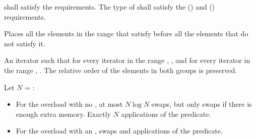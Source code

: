 \begin{itemdescr}
\pnum
\requires
{} shall satisfy the
 requirements. The type
of  shall satisfy the
 () and
 () requirements.

\pnum
\effects
Places all the elements in the range
that satisfy  before all the
elements that do not satisfy it.

\pnum
\returns
An iterator
such that for every iterator
in the range
,
,
and for every iterator
in the range
,
.
The relative order of the elements in both groups is preserved.

\pnum
\complexity
Let $N$ = :
\begin{itemize}
\item For the overload with no , at most $N \log N$ swaps,
but only  swaps if there is enough extra memory.  Exactly $N$
applications of the predicate.
\item For the overload with an ,
 swaps and  applications of the predicate.
\end{itemize}
\end{itemdescr}

